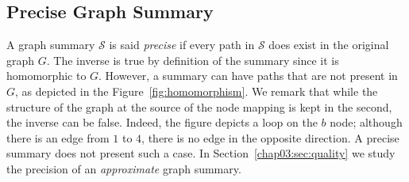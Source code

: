 %

\subsection{Precise Graph Summary}

A graph summary $\mathcal{S}$ is said \emph{precise} if every path in $\mathcal{S}$ does exist in the original graph $G$. The inverse is true by definition of the summary since it is homomorphic to $G$. However, a summary can have paths that are not present in $G$, as depicted in the Figure~\ref{fig:homomorphism}. We remark that while the structure of the graph at the source of the node mapping is kept in the second, the inverse can be false. Indeed, the figure depicts a loop on the $b$ node; although there is an edge from $1$ to $4$, there is no edge in the opposite direction. A precise summary does not present such a case. In Section~\ref{chap03:sec:quality} we study the precision of an \emph{approximate} graph summary.


